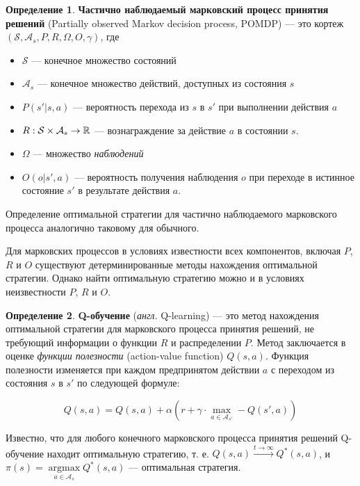 \documentclass[specification,annotation,times]{itmo-student-thesis}
\DeclareMathOperator{\argmax}{argmax}
\theoremstyle{definition}
\newtheorem{definition-ru}{Определение}
\begin{document}
\begin{definition-ru}
  \textbf{Частично наблюдаемый марковский процесс принятия решений} (Partially
  observed Markov decision process, POMDP) --- это кортеж
  $(\mathcal{S}, \mathcal{A}_s, P, R, \Omega, O, \gamma)$, где
  \begin{itemize}
  \item $\mathcal{S}$ --- конечное множество состояний
  \item $\mathcal{A}_s$ --- конечное множество действий, доступных из состояния $s$
  \item $P(s' | s, a)$ --- вероятность перехода из $s$ в $s'$ при выполнении
    действия $a$
  \item $R : \mathcal{S} \times \mathcal{A}_s \rightarrow \Bbb{R}$ ---
    вознаграждение за действие $a$ в состоянии $s$.
  \item $\Omega$ --- множество \textit{наблюдений}
  \item $O(o | s', a)$ --- вероятность получения наблюдения $o$ при переходе в
    истинное состояние $s'$ в результате действия $a$. 
  \end{itemize}
\end{definition-ru}

Определение оптимальной стратегии для частично наблюдаемого марковского процесса
аналогично таковому для обычного.

Для марковских процессов в условиях известности всех компонентов, включая $P$,
$R$ и $O$ существуют детерминированные методы нахождения оптимальной стратегии.
Однако найти оптимальную стратегию можно и в условиях неизвестности $P$, $R$ и $O$.

\begin{definition-ru}
  \textbf{Q-обучение} (\textit{англ.} Q-learning) \cite{q-learning-orig} --- это метод нахождения
  оптимальной стратегии для марковского процесса принятия решений, не требующий
  информации о функции $R$ и распределении $P$. Метод заключается в оценке
  \textit{функции полезности} (action-value function)
  $Q(s,a)$. Функция полезности изменяется при каждом предпринятом действии $a$ с
  переходом из состояния $s$ в $s'$ по следующей формуле:

  \begin{equation}
    Q(s, a) = Q(s, a) + \alpha \left( r +
    \gamma \cdot \max\limits_{a \in \mathcal{A}_{s'}} - Q(s', a) \right)
  \end{equation}
\end{definition-ru}

Известно, что для любого конечного марковского процесса принятия решений
Q-обучение находит оптимальную стратегию, т. е. $Q(s, a) \xrightarrow{t
  \rightarrow \infty} Q^*(s, a)$, и $\pi(s) = \argmax\limits_{a \in
  \mathcal{A}_s} {Q^*(s, a)}$ --- оптимальная стратегия.
\end{document}
